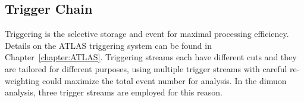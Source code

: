 




\subsection{Trigger Chain}
\label{section:trigger}
Triggering is the selective storage and event for maximal processing efficiency. Details on the ATLAS triggering system can be found in Chapter~\ref{chapter:ATLAS}.
Triggering streams each have different cuts and they are tailored for different purposes, using multiple trigger streams with careful re-weighting could maximize the total event number for analysis. In the dimuon analysis, three trigger streams are employed for this reason.

